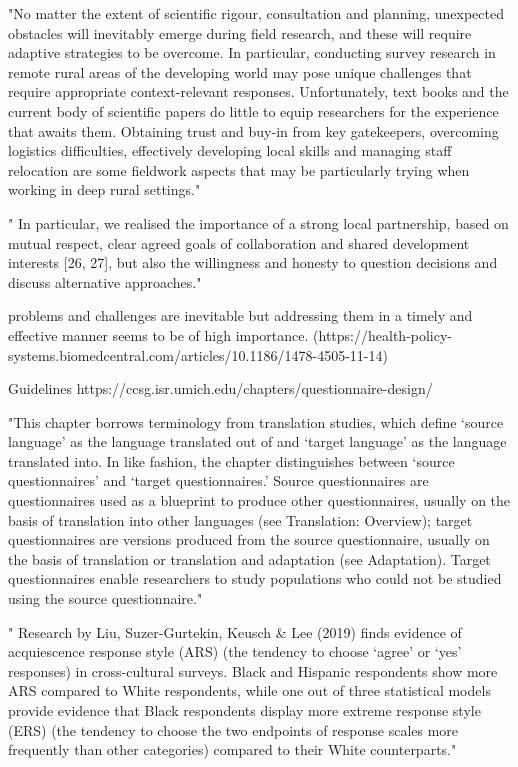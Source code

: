 "No matter the extent of scientific rigour, consultation and planning, unexpected obstacles will inevitably emerge during field research, and these will require adaptive strategies to be overcome. In particular, conducting survey research in remote rural areas of the developing world may pose unique challenges that require appropriate context-relevant responses. Unfortunately, text books and the current body of scientific papers do little to equip researchers for the experience that awaits them. Obtaining trust and buy-in from key gatekeepers, overcoming logistics difficulties, effectively developing local skills and managing staff relocation are some fieldwork aspects that may be particularly trying when working in deep rural settings."

" In particular, we realised the importance of a strong local partnership, based on mutual respect, clear agreed goals of collaboration and shared development interests [26, 27], but also the willingness and honesty to question decisions and discuss alternative approaches."

problems and challenges are inevitable but addressing them in a timely and effective manner seems to be of high importance. (https://health-policy-systems.biomedcentral.com/articles/10.1186/1478-4505-11-14)

Guidelines https://ccsg.isr.umich.edu/chapters/questionnaire-design/

"This chapter borrows terminology from translation studies, which define ‘source language’ as the language translated out of and ‘target language’ as the language translated into. In like fashion, the chapter distinguishes between ‘source questionnaires’ and ‘target questionnaires.’ Source questionnaires are questionnaires used as a blueprint to produce other questionnaires, usually on the basis of translation into other languages (see Translation: Overview); target questionnaires are versions produced from the source questionnaire, usually on the basis of translation or translation and adaptation (see Adaptation). Target questionnaires enable researchers to study populations who could not be studied using the source questionnaire."

" Research by Liu, Suzer-Gurtekin, Keusch & Lee (2019) finds evidence of acquiescence response style (ARS) (the tendency to choose ‘agree’ or ‘yes’ responses) in cross-cultural surveys. Black and Hispanic respondents show more ARS compared to White respondents, while one out of three statistical models provide evidence that Black respondents display more extreme response style (ERS) (the tendency to choose the two endpoints of response scales more frequently than other categories) compared to their White counterparts."


